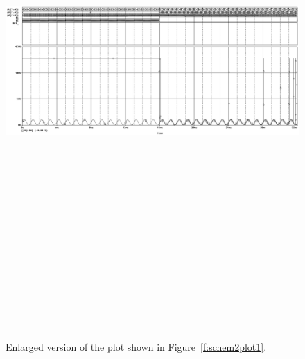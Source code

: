 \begin{figure}[H]
\centering
	\includegraphics[angle=90, height=8in]{img/shot/sim2_plot1.png}
	\parbox{.8\textwidth}{
	\caption[Part 2 Simulation Results 1 (Full Size)]{Enlarged
	version of the plot shown in Figure~\ref{f:schem2plot1}.}
	\label{f:schem2plot1_big}}
\end{figure}

